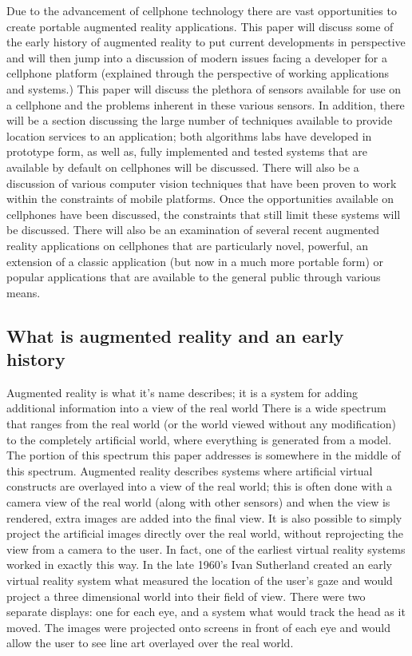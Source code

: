 \documentclass{acm_proc_article-sp}
\begin{document}
Due to the advancement of cellphone technology there are vast opportunities to create portable augmented reality applications.  This paper will discuss some of the early history of augmented reality to put current developments in perspective and will then jump into a discussion of modern issues facing a developer for a cellphone platform (explained through the perspective of working applications and systems.)  This paper will discuss the plethora of sensors available for use on a cellphone and the problems inherent in these various sensors.  In addition, there will be a section discussing the large number of techniques available to provide location services to an application; both algorithms labs have developed in prototype form, as well as, fully implemented and tested systems that are available by default on cellphones will be discussed. There will also be a discussion of various computer vision techniques that have been proven to work within the constraints of mobile platforms.  Once the opportunities available on cellphones have been discussed, the constraints that still limit these systems will be discussed. There will also be an examination of several recent augmented reality applications on cellphones that are particularly novel, powerful, an extension of a classic application (but now in a much more portable form) or popular applications that are available to the general public through various means.

\subsection{What is augmented reality and an early history}

Augmented reality is what it's name describes; it is a system for adding additional information into a view of the real world \cite{mizell1994virtual} There is a wide spectrum that ranges from the real world (or the world viewed without any modification) to the completely artificial world, where everything is generated from a model. \cite{milgram1994taxonomy} The portion of this spectrum this paper addresses is somewhere in the middle of this spectrum.   Augmented reality describes systems where artificial virtual constructs are overlayed into a view of the real world; this is often done with a camera view of the real world (along with other sensors) and when the view is rendered, extra images are added into the final view.  It is also possible to simply project the artificial images directly over the real world, without reprojecting the view from a camera to the user.  In fact, one of the earliest virtual reality systems worked in exactly this way.  In the late 1960's  Ivan Sutherland created an early virtual reality system what measured the location of the user's gaze and would project a three dimensional world into their field of view.  There were two separate displays: one for each eye, and a system what would track the head as it moved.  The images were projected onto screens in front of each eye and would allow the user to see line art overlayed over the real world. \cite{Sutherland:1968:HTD:1476589.1476686}
\end{document}
